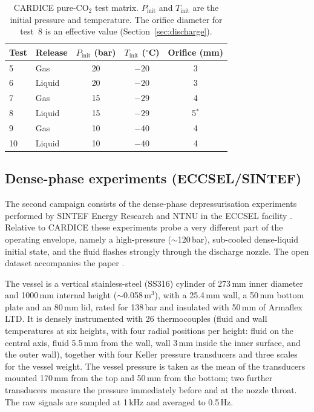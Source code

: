 \documentclass[5p,authoryear]{elsarticle}
\begin{document}
\begin{table}[!tbh]
\centering
\caption{CARDICE pure-CO$_2$ test matrix. $P_\text{init}$ and $T_\text{init}$ are the initial pressure and
temperature. The orifice diameter for test~8 is an effective value (Section~\ref{sec:discharge}).}
\label{tab:cardice-matrix}
\begin{tabular}{llccc}
\toprule
Test & Release & $P_\text{init}$ (bar) & $T_\text{init}$ ($^\circ$C) & Orifice (mm) \\
\midrule
5  & Gas    & 20 & $-20$ & 3 \\
6  & Liquid & 20 & $-20$ & 3 \\
7  & Gas    & 15 & $-29$ & 4 \\
8  & Liquid & 15 & $-29$ & 5$^{*}$ \\
9  & Gas    & 10 & $-40$ & 4 \\
10 & Liquid & 10 & $-40$ & 4 \\
\bottomrule
\end{tabular}
\end{table}

\subsection{Dense-phase experiments (ECCSEL/SINTEF)}
\label{sec:exp-sintef}

The second campaign consists of the dense-phase depressurisation experiments performed by
SINTEF Energy Research and NTNU in the ECCSEL facility \citep{Hoydalsvik2026}. Relative to
CARDICE these experiments probe a very different part of the operating envelope, namely a
high-pressure ($\sim$120\,bar), sub-cooled dense-liquid initial state, and the fluid flashes
strongly through the discharge nozzle. The open dataset accompanies the paper \citep{HoydalsvikData2026}.

The vessel is a vertical stainless-steel (SS316) cylinder of 273\,mm inner diameter and
1000\,mm internal height ($\sim$0.058\,m$^3$), with a 25.4\,mm wall, a 50\,mm bottom plate and
an 80\,mm lid, rated for 138\,bar and insulated with 50\,mm of Armaflex LTD. It is densely
instrumented with 26 thermocouples (fluid and wall temperatures at six heights, with four
radial positions per height: fluid on the central axis, fluid 5.5\,mm from the wall, wall 3\,mm
inside the inner surface, and the outer wall), together with four Keller pressure
transducers and three scales for the vessel weight. The vessel pressure is taken as the mean of
the transducers mounted 170\,mm from the top and 50\,mm from the bottom; two further transducers
measure the pressure immediately before and at the nozzle throat. The raw signals are sampled at
1\,kHz and averaged to 0.5\,Hz.
\end{document}
